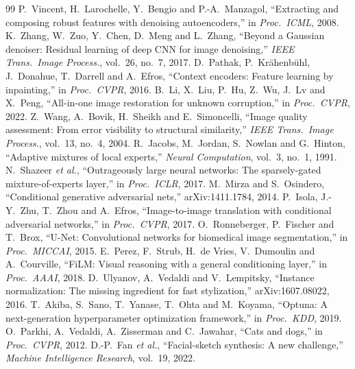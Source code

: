 \documentclass[conference]{IEEEtran}
\begin{document}
\begin{thebibliography}{99}
 P.~Vincent, H.~Larochelle, Y.~Bengio and P.-A.~Manzagol, ``Extracting and composing robust features with denoising autoencoders,'' in \emph{Proc.\ ICML}, 2008.
 K.~Zhang, W.~Zuo, Y.~Chen, D.~Meng and L.~Zhang, ``Beyond a Gaussian denoiser: Residual learning of deep CNN for image denoising,'' \emph{IEEE Trans.\ Image Process.}, vol.~26, no.~7, 2017.
 D.~Pathak, P.~Kr\"ahenb\"uhl, J.~Donahue, T.~Darrell and A.~Efros, ``Context encoders: Feature learning by inpainting,'' in \emph{Proc.\ CVPR}, 2016.
 B.~Li, X.~Liu, P.~Hu, Z.~Wu, J.~Lv and X.~Peng, ``All-in-one image restoration for unknown corruption,'' in \emph{Proc.\ CVPR}, 2022.
 Z.~Wang, A.~Bovik, H.~Sheikh and E.~Simoncelli, ``Image quality assessment: From error visibility to structural similarity,'' \emph{IEEE Trans.\ Image Process.}, vol.~13, no.~4, 2004.
 R.~Jacobs, M.~Jordan, S.~Nowlan and G.~Hinton, ``Adaptive mixtures of local experts,'' \emph{Neural Computation}, vol.~3, no.~1, 1991.
 N.~Shazeer \emph{et al.}, ``Outrageously large neural networks: The sparsely-gated mixture-of-experts layer,'' in \emph{Proc.\ ICLR}, 2017.
 M.~Mirza and S.~Osindero, ``Conditional generative adversarial nets,'' arXiv:1411.1784, 2014.
 P.~Isola, J.-Y.~Zhu, T.~Zhou and A.~Efros, ``Image-to-image translation with conditional adversarial networks,'' in \emph{Proc.\ CVPR}, 2017.
 O.~Ronneberger, P.~Fischer and T.~Brox, ``U-Net: Convolutional networks for biomedical image segmentation,'' in \emph{Proc.\ MICCAI}, 2015.
 E.~Perez, F.~Strub, H.~de Vries, V.~Dumoulin and A.~Courville, ``FiLM: Visual reasoning with a general conditioning layer,'' in \emph{Proc.\ AAAI}, 2018.
 D.~Ulyanov, A.~Vedaldi and V.~Lempitsky, ``Instance normalization: The missing ingredient for fast stylization,'' arXiv:1607.08022, 2016.
 T.~Akiba, S.~Sano, T.~Yanase, T.~Ohta and M.~Koyama, ``Optuna: A next-generation hyperparameter optimization framework,'' in \emph{Proc.\ KDD}, 2019.
 O.~Parkhi, A.~Vedaldi, A.~Zisserman and C.~Jawahar, ``Cats and dogs,'' in \emph{Proc.\ CVPR}, 2012.
 D.-P.~Fan \emph{et al.}, ``Facial-sketch synthesis: A new challenge,'' \emph{Machine Intelligence Research}, vol.~19, 2022.
\end{thebibliography}
\end{document}
